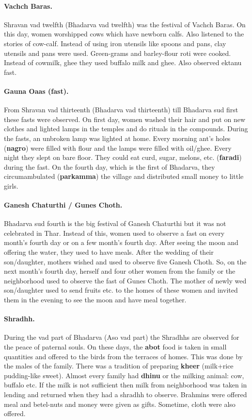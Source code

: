 \paragraph{Vachch Baras.} Shravan vad twelfth (Bhadarva vad twelfth) was the
festival of Vachch Baras. On this day, women worshipped cows which have newborn
calfs. Also listened to the stories of cow-calf. Instead of using iron utensils
like spoons and pans, clay utensils and pans were used. Green-grams and
barley-flour roti were cooked. Instead of cowmilk, ghee they used buffalo milk
and ghee. Also observed ektanu fast.
\paragraph{Gauna Oaas (fast).} From Shravan vad thirteenth (Bhadarva vad
thirteenth) till Bhadarva sud first these fasts were observed. On first day,
women washed their hair and put on new clothes and lighted lamps in the temples
and do rituals in the compounds. During the fasts, an unbroken lamp was lighted
at home. Every morning ant's holes (\textbf{nagro}) were filled with flour and
the lamps were filled with oil/ghee. Every night they slept on bare floor. They
could eat curd, sugar, melons, etc. (\textbf{faradi}) during the fast. On the
fourth day, which is the first of Bhadarva, they circumambulated
(\textbf{parkamma}) the village and distributed small money to little girls.
\paragraph{Ganesh Chaturthi / Gunes Choth.} Bhadarva sud fourth is the big
festival of Ganesh Chaturthi but it was not celebrated in Thar. Instead of
this, women used to observe a fast on every month's fourth day or on a few
month's fourth day.  After seeing the moon and offering the water, they used to
have meals. After the wedding of their son/daughter, mothers wished and used to
observe five Ganesh Choth. So, on the next month's fourth day, herself and four
other women from the family or the neighborhood used to observe the fast of
Gunes Choth.  The mother of newly wed son/daughter used to send fruits etc. to
the homes of these women and invited them in the evening to see the moon and
have meal together.  \paragraph{Shradhh.} During the vad part of Bhadarva (Aso
vad part) the Shradhhs are observed for the peace of paternal souls. On these
days, the \textbf{abot} food is taken in small quantities and offered to the birds from
the terraces of homes.  This was done by the males of the family. There was a
tradition of preparing \textbf{kheer} (milk+rice pudding-like sweet). Almost
every family had \textbf{dhinu} or the milking animal: cow, buffalo etc. If the
milk is not sufficient then milk from neighborhood was taken in lending and
returned when they had a shradhh to observe. Brahmins were offered meal and
betel-nuts and money were given as gifts. Sometime, cloth were also offered.

